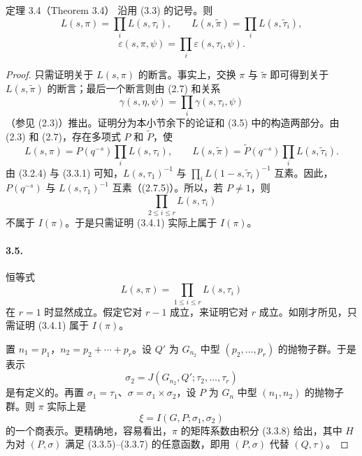 \begin{originaltheorem}{定理 3.4（Theorem 3.4）}
沿用 (3.3) 的记号。则
\[
L(s,\pi)=\prod_iL(s,\tau_i),\qquad
L(s,\widetilde\pi)=\prod_iL(s,\widetilde\tau_i),
\]
\[
\varepsilon(s,\pi,\psi)=\prod_i\varepsilon(s,\tau_i,\psi).
\]
\end{originaltheorem}
\begin{proof}
只需证明关于 $L(s,\pi)$ 的断言。事实上，交换 $\pi$ 与 $\widetilde\pi$ 即可得到关于 $L(s,\widetilde\pi)$ 的断言；最后一个断言则由 (2.7) 和关系
\[
\gamma(s,\eta,\psi)=\prod_i\gamma(s,\tau_i,\psi)
\]
（参见 (2.3)）推出。证明分为本小节余下的论证和 (3.5) 中的构造两部分。由 (2.3) 和 (2.7)，存在多项式 $P$ 和 $\widetilde P$，使
\[
L(s,\pi)=P(q^{-s})\prod_iL(s,\tau_i),\qquad
L(s,\widetilde\pi)=\widetilde P(q^{-s})\prod_iL(s,\widetilde\tau_i).
\]
由 (3.2.4) 与 (3.3.1) 可知，$L(s,\tau_1)^{-1}$ 与 $\prod_iL(1-s,\widetilde\tau_i)^{-1}$ 互素。因此，$P(q^{-s})$ 与 $L(s,\tau_1)^{-1}$ 互素（(2.7.5)）。所以，若 $P\ne1$，则
\begin{equation}
\prod_{2\leq i\leq r}L(s,\tau_i)\tag{3.4.1}
\end{equation}
不属于 $I(\pi)$。于是只需证明 (3.4.1) 实际上属于 $I(\pi)$。

\paragraph*{3.5.}
恒等式
\begin{equation}
L(s,\pi)=\prod_{1\leq i\leq r}L(s,\tau_i)\tag{3.5.1}
\end{equation}
在 $r=1$ 时显然成立。假定它对 $r-1$ 成立，来证明它对 $r$ 成立。如刚才所见，只需证明 (3.4.1) 属于 $I(\pi)$。

置 $n_1=p_1$，$n_2=p_2+\cdots+p_r$。设 $Q'$ 为 $G_{n_2}$ 中型 $(p_2,\ldots,p_r)$ 的抛物子群。于是表示
\begin{equation}
\sigma_2=J(G_{n_2},Q';\tau_2,\ldots,\tau_r)\tag{3.5.2}
\end{equation}
是有定义的。再置 $\sigma_1=\tau_1$、$\sigma=\sigma_1\times\sigma_2$，设 $P$ 为 $G_n$ 中型 $(n_1,n_2)$ 的抛物子群。则 $\pi$ 实际上是
\begin{equation}
\xi=I(G,P;\sigma_1,\sigma_2)\tag{3.5.3}
\end{equation}
的一个商表示。更精确地，容易看出，$\pi$ 的矩阵系数由积分 (3.3.8) 给出，其中 $H$ 为对 $(P,\sigma)$ 满足 (3.3.5)--(3.3.7) 的任意函数，即用 $(P,\sigma)$ 代替 $(Q,\tau)$。


\end{proof}

